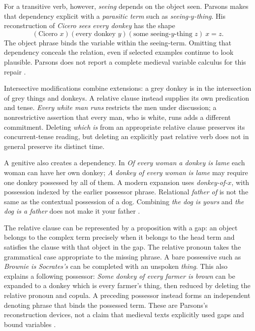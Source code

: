 For a transitive verb, however, \emph{seeing} depends on the object seen.
Parsons makes that dependency explicit with a \emph{parasitic term}
such as \emph{seeing-\(y\)-thing}. His reconstruction of
\emph{Cicero sees every donkey} has the shape
\[
(\text{Cicero }x)(\text{every donkey }y)
(\text{some seeing-}y\text{-thing }z)\ x=z.
\]
The object phrase binds the variable within the seeing-term. Omitting
that dependency conceals the relation, even if selected examples
continue to look plausible. Parsons does not report a complete medieval
variable calculus for this repair
\cite[pp.~174--177]{Parsons2007FordhamSupposition}.

Intersective modifications combine extensions: a grey donkey is
in the intersection of grey things and donkeys. A relative clause
instead supplies its own predication and tense. \emph{Every white man
runs} restricts the men under discussion; a nonrestrictive assertion
that every man, who is white, runs adds a different commitment.
Deleting \emph{which is} from an appropriate relative clause preserves
its concurrent-tense reading, but deleting an explicitly past relative
verb does not in general preserve its distinct time.

A genitive also creates a dependency. In
\emph{Of every woman a donkey is lame} each woman can have her own
donkey; \emph{A donkey of every woman is lame} may require one donkey
possessed by all of them. A modern expansion uses
\emph{donkey-of-\(x\)}, with possession indexed by the earlier possessor
phrase. Relational \emph{father of} is not the same as the contextual
possession of a dog. Combining \emph{the dog is yours} and \emph{the dog is
a father} does not make it your father
\cite[pp.~179--184]{Parsons2007FordhamSupposition}.


The relative clause can be represented by a proposition with a gap:
an object belongs to the complex term precisely when it belongs to
the head term and satisfies the clause with that object in the gap.
The relative pronoun takes the grammatical case appropriate to the
missing phrase. A bare possessive such as \emph{Brownie is Socrates's}
can be completed with an unspoken \emph{thing}. This also explains a
following possessor: \emph{Some donkey of every farmer is brown}
can be expanded to a donkey which is every farmer's thing, then reduced
by deleting the relative pronoun and copula. A preceding possessor
instead forms an independent denoting phrase that binds the possessed
term. These are Parsons's reconstruction devices, not a claim that
medieval texts explicitly used gaps and bound variables
\cite[pp.~180--185]{Parsons2007FordhamSupposition}.

